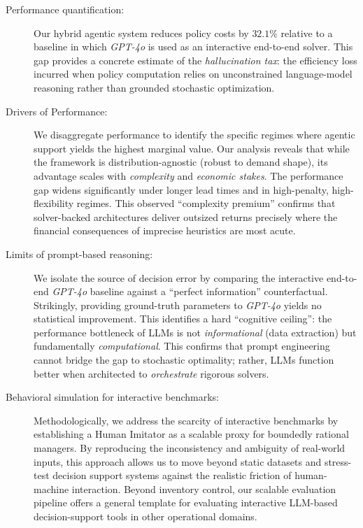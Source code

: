 \documentclass[mnsc,nonblindrev]{informs3_hide}
\begin{document}
    \begin{description}
        \item[Performance quantification:] Our hybrid agentic system reduces policy costs by $32.1\%$ relative to a baseline in which \emph{GPT-4o} is used as an interactive end-to-end solver. This gap provides a concrete estimate of the \emph{hallucination tax}: the efficiency loss incurred when policy computation relies on unconstrained language-model reasoning rather than grounded stochastic optimization. 

   
        
        \item[Drivers of Performance:] We disaggregate performance to identify the specific regimes where agentic support yields the highest marginal value. Our analysis reveals that while the framework is distribution-agnostic (robust to demand shape), its advantage scales with \textit{complexity} and \textit{economic stakes}. The performance gap widens significantly under longer lead times and in high-penalty, high-flexibility regimes. This observed ``complexity premium'' confirms that solver-backed architectures deliver outsized returns precisely where the financial consequences of imprecise heuristics are most acute.

    \item[Limits of prompt-based reasoning:] We isolate the source of decision error by comparing the interactive end-to-end \emph{GPT-4o} baseline against a ``perfect information'' counterfactual. Strikingly, providing ground-truth parameters to \emph{GPT-4o} yields no statistical improvement. This identifies a hard ``cognitive ceiling'': the performance bottleneck of LLMs is not \textit{informational} (data extraction) but fundamentally \textit{computational}. This confirms that prompt engineering cannot bridge the gap to stochastic optimality; rather, LLMs function better when architected to \emph{orchestrate} rigorous solvers.
        
      
        

        \item[Behavioral simulation for interactive benchmarks:] Methodologically, we address the scarcity of interactive benchmarks by establishing a Human Imitator as a scalable proxy for boundedly rational managers. By reproducing the inconsistency and ambiguity of real-world inputs, this approach allows us to move beyond static datasets and stress-test decision support systems against the realistic friction of human-machine interaction. Beyond inventory control, our scalable evaluation pipeline offers a general template for evaluating interactive LLM-based decision-support tools in other operational domains.

    \end{description}
    
\end{document}
